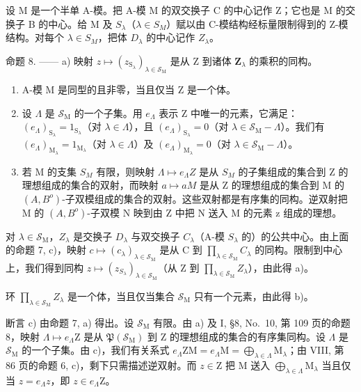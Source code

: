 设 M 是一个半单 A-模。把 A-模 M 的双交换子 C 的中心记作 Z；它也是 M 的交换子 B 的中心。给 M 及 \(S_{\lambda}\)（\(\lambda \in S_{M}\)）赋以由 C-模结构经标量限制得到的 Z-模结构。对每个 \(\lambda \in S_{M}\)，把体 \(D_{\lambda}\) 的中心记作 \(Z_{\lambda}\)。

命题 8. —— a) 映射 \(z \mapsto (z_{\mathrm{S}_{\lambda}})_{\lambda \in \mathcal{S}_{\mathrm{M}}}\) 是从 Z 到诸体 \(\mathbf{Z}_{\lambda}\) 的乘积的同构。

\begin{enumerate}
\def\labelenumi{\alph{enumi})}
\setcounter{enumi}{1}
\item
  A-模 M 是同型的且非零，当且仅当 Z 是一个体。
\item
  设 \(\Lambda\) 是 \(\mathcal{S}_{\mathrm{M}}\) 的一个子集。用 \(e_{\Lambda}\) 表示 \(\mathrm{Z}\) 中唯一的元素，它满足：\((e_{\Lambda})_{\mathrm{S}_{\lambda}} = 1_{\mathrm{S}_{\lambda}}\)（对 \(\lambda \in \Lambda\)），且 \((e_{\Lambda})_{\mathrm{S}_{\lambda}} = 0\)（对 \(\lambda \in \mathcal{S}_{\mathrm{M}} - \Lambda\)）。我们有 \((e_{\Lambda})_{\mathrm{M}_{\lambda}} = 1_{\mathrm{M}_{\lambda}}\)（对 \(\lambda \in \Lambda\)）及 \((e_{\Lambda})_{\mathrm{M}_{\lambda}} = 0\)（对 \(\lambda \in \mathcal{S}_{\mathrm{M}} - \Lambda\)）。
\item
  若 M 的支集 \(S_{M}\) 有限，则映射 \(\Lambda \mapsto e_{\Lambda}Z\) 是从 \(S_{M}\) 的子集组成的集合到 Z 的理想组成的集合的双射，而映射 \(a \mapsto aM\) 是从 Z 的理想组成的集合到 M 的 \((A,B^{o})\)-子双模组成的集合的双射。这些双射都是有序集的同构。逆双射把 M 的 \((A,B^{o})\)-子双模 N 映到由 Z 中把 N 送入 M 的元素 z 组成的理想。
\end{enumerate}

对 \(\lambda \in \mathcal{S}_{\mathrm{M}}\)，\(Z_{\lambda}\) 是交换子 \(D_{\lambda}\) 与双交换子 \(C_{\lambda}\)（A-模 \(S_{\lambda}\) 的）的公共中心。由上面的命题 7, c)，映射 \(c \mapsto (c_{\lambda})_{\lambda \in \mathcal{S}_{\mathrm{M}}}\) 是从 C 到 \(\prod_{\lambda \in \mathcal{S}_{\mathrm{M}}} C_{\lambda}\) 的同构。限制到中心上，我们得到同构 \(z \mapsto (z_{S_{\lambda}})_{\lambda \in \mathcal{S}_{\mathrm{M}}}\)（从 Z 到 \(\prod_{\lambda \in \mathcal{S}_{\mathrm{M}}} Z_{\lambda}\)），由此得 a)。

环 \(\prod_{\lambda \in \mathcal{S}_{\mathrm{M}}}Z_{\lambda}\) 是一个体，当且仅当集合 \(\mathcal{S}_{\mathrm{M}}\) 只有一个元素，由此得 b)。

断言 c) 由命题 7, a) 得出。设 \(\mathcal{S}_{\mathrm{M}}\) 有限。由 a) 及 I, §8, No.~10, 第 109 页的命题 8，映射 \(\Lambda \mapsto e_{\Lambda}\mathrm{Z}\) 是从 \(\mathfrak{P}(\mathcal{S}_{\mathrm{M}})\) 到 Z 的理想组成的集合的有序集同构。设 \(\Lambda\) 是 \(\mathcal{S}_{\mathrm{M}}\) 的一个子集。由 c)，我们有关系式 \(e_{\Lambda}\mathrm{ZM} = e_{\Lambda}\mathrm{M} = \bigoplus_{\lambda \in \Lambda}\mathrm{M}_{\lambda}\)；由 VIII, 第 86 页的命题 6, c)，剩下只需描述逆双射。而 \(z \in \mathrm{Z}\) 把 M 送入 \(\bigoplus_{\lambda \in \Lambda}\mathrm{M}_{\lambda}\) 当且仅当 \(z = e_{\Lambda}z\)，即 \(z \in e_{\Lambda}\mathrm{Z}\)。


